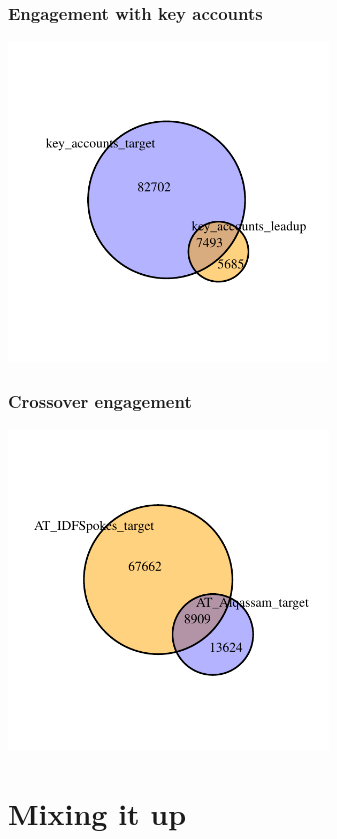\documentclass{beamer}
\begin{document}
\begin{frame}\frametitle{Engagement with key accounts}
  \begin{center}
    \includegraphics[width=8.5cm]{./imgs/HI_minimal-venns6.pdf}
  \end{center}
\end{frame}

\begin{frame}\frametitle{Crossover engagement}
  \begin{center}
    \includegraphics[width=8.5cm]{./imgs/HI_minimal-venns8.pdf}
  \end{center}
\end{frame}

\section{Mixing it up}
{
\begin{frame}
\textcolor{black} {
\Huge \hfill \insertsection}
\end{frame}
}
\end{document}
